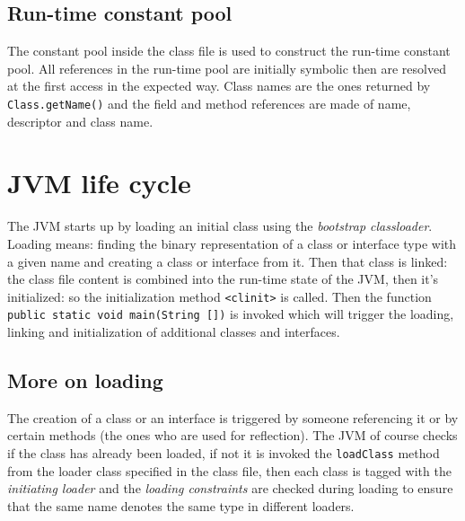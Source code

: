 \subsection{Run-time constant pool}
The constant pool inside the class file is used to construct the run-time constant pool.
All references in the run-time pool are initially symbolic then are resolved at the first access in the expected way.
Class names are the ones returned by \verb|Class.getName()| and the field and method references are made of name, descriptor and class name.

\section{JVM life cycle}
The JVM starts up by loading an initial class using the \emph{bootstrap classloader}.
Loading means: finding the binary representation of a class or interface type with a given name and creating a class or interface from it.
Then that class is linked: the class file content is combined into the run-time state of the JVM, then it's initialized: so the initialization method \verb|<clinit>| is called.
Then the function \verb|public static void main(String [])| is invoked which will trigger the loading, linking and initialization of additional classes and interfaces.

\subsection{More on loading}
The creation of a class or an interface is triggered by someone referencing it or by certain methods (the ones who are used for reflection).
The JVM of course checks if the class has already been loaded, if not it is invoked the \verb|loadClass| method from the loader class specified in the class file, then each class is tagged with the \emph{initiating loader} and the \emph{loading constraints} are checked during loading to ensure that the same name denotes the same type in different loaders.

